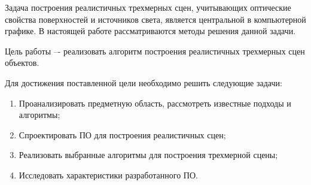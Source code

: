 
Задача построения реалистичных трехмерных сцен, учитывающих оптические свойства поверхностей и источников света, является центральной в компьютерной графике. В настоящей работе рассматриваются методы решения данной задачи.

Цель работы –- реализовать алгоритм построения реалистичных трехмерных сцен объектов.

Для достижения поставленной цели необходимо решить следующие задачи:
\begin{enumerate}
	\item Проанализировать предметную область, рассмотреть известные подходы и алгоритмы;
	\item Спроектировать ПО для построения реалистичных сцен;
	\item Реализовать выбранные алгоритмы для построения трехмерной сцены;
	\item Исследовать характеристики разработанного ПО.
\end{enumerate}

\clearpage

